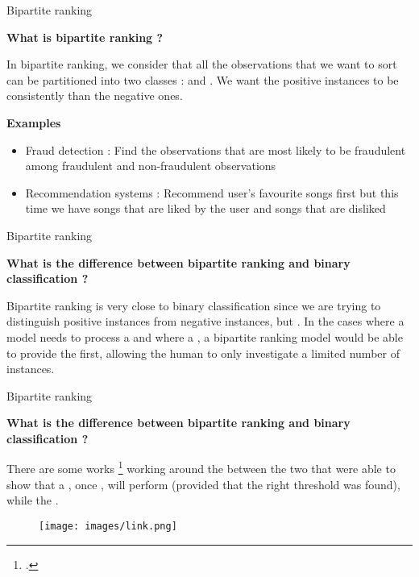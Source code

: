 \begin{frame}{Bipartite ranking}

    {\large\textbf{What is bipartite ranking ?}}
    
    In bipartite ranking, we consider that all the observations that we want to sort can be partitioned into two classes :  and . We want the positive instances to be consistently  than the negative ones.
    
    \vspace{0.3cm}

    {\large\textbf{Examples}}
    
    \begin{itemize}
        \item Fraud detection : Find the observations that are most likely to be fraudulent among fraudulent and non-fraudulent observations
        \item Recommendation systems : Recommend user's favourite songs first but this time we have songs that are liked by the user and songs that are disliked
    \end{itemize}
\end{frame}

\begin{frame}{Bipartite ranking}

    {\large\textbf{What is the difference between bipartite ranking and binary classification ?}}

    Bipartite ranking is very close to binary classification since we are trying to distinguish positive instances from negative instances, but . In the cases where a model needs to process a  and where a , a bipartite ranking model would be able to provide the  first, allowing the human to only investigate a limited number of instances.
    
\end{frame}

\begin{frame}{Bipartite ranking}

    {\large\textbf{What is the difference between bipartite ranking and binary classification ?}}

    There are some works \footcite{narasimhan2013relationship} working around the  between the two that were able to show that a , once , will perform  (provided that the right threshold was found), while the . 

    \begin{figure}
        \centering
        \texttt{[image: images/link.png]}
    \end{figure}
    
\end{frame}

